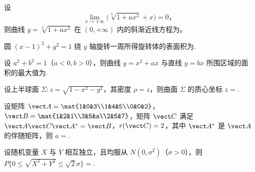 \begin{question}[index=11]
设
\[
\lim_{x\to+\infty}\bigl(\sqrt[3]{1+ax^3}+x\bigr)=0\text{，}
\]
则曲线 $y=\sqrt[3]{1+ax^3}$ 在 $(0,+\infty)$ 内的斜渐近线方程为\fillin。
\end{question}
\QuestionBreak

\begin{question}[index=12]
圆 $(x-1)^2+y^2=1$ 绕 $y$ 轴旋转一周所得旋转体的表面积为\fillin.
\end{question}
\QuestionBreak

\begin{question}[index=13]
设 $a^2+b^2=1$（$a<0,b>0$），则曲线 $y=x^2+ax$ 与直线 $y=bx$ 所围区域的面积的最大值为\fillin.
\end{question}
\QuestionBreak

\begin{question}[index=14]
设上半球面 $\Sigma:z=\sqrt{1-x^2-y^2}$，其密度 $\rho=z$，则曲面 $\Sigma$ 的质心坐标 $\overline z=$\fillin.
\end{question}
\QuestionBreak

\begin{question}[index=15]
设矩阵 $\vect A=\mat{1&0&3\\1&4&5\\0&0&2}$，$\vect B=\mat{1&2&1\\3&5&a\\2&5&7}$，矩阵 $\vect C$ 满足 $\vect A\vect C\vect A^*=\vect B$，$r(\vect C)=2$，其中 $\vect A^*$ 是 $\vect A$ 的伴随矩阵，则 $a=$\fillin.
\end{question}
\QuestionBreak

\begin{question}[index=16]
设随机变量 $X$ 与 $Y$ 相互独立，且均服从 $N(0,\sigma^2)$（$\sigma>0$），则 $P\{0\le\sqrt{X^2+Y^2}\le\sqrt2\sigma\}=$\fillin.
\end{question}
